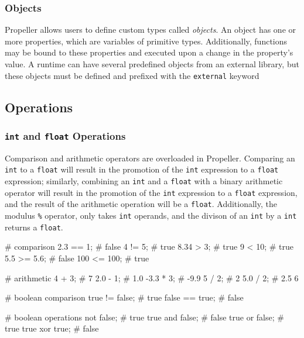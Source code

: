 \subsubsection{Objects}
Propeller allows users to define custom types called \textit{objects}. An object has one or
more properties, which are variables of primitive types. Additionally, functions may be bound
to these properties and executed upon a change in the property's value. A runtime can have
several predefined objects from an external library, but these objects must be defined
and prefixed with the \texttt{external} keyword

\subsection{Operations}


\subsubsection{\texttt{int} and \texttt{float} Operations}
Comparison and arithmetic operators are overloaded in Propeller. Comparing an \texttt{int} to a
\texttt{float} will result in the promotion of the \texttt{int} expression to a \texttt{float} expression;
similarly, combining an \texttt{int} and a \texttt{float} with a binary arithmetic operator will result
in the promotion of the \texttt{int} expression to a \texttt{float} expression, and the result of the
arithmetic operation will be a \texttt{float}. Additionally, the modulus \texttt{\%}
operator, only takes \texttt{int} operands, and the divison of an \texttt{int} by a \texttt{int} returns
a \texttt{float}.

\begin{mylistingn}
# comparison
2.3 == 1;   # false
4 != 5;     # true
8.34 > 3;   # true
9 < 10;     # true
5.5 >= 5.6; # false
100 <= 100; # true

# arithmetic
4 + 3;    # 7
2.0 - 1;  # 1.0
-3.3 * 3; # -9.9
5 / 2;    # 2
5.0 / 2;  # 2.5
6 %

# boolean comparison
true != false; # true
false == true; # false

# boolean operations
not false;      # true
true and false; # false
true or false;  # true
true xor true;  # false
\end{mylistingn}


